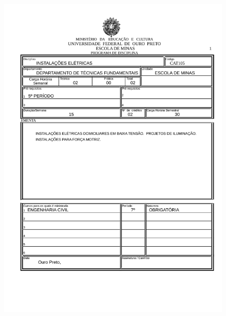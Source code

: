\begin{figure}[p]
	\centering 
	\includegraphics[scale=0.7]{capitulos/anexo1-programas-disciplina/eg33.pdf}
\end{figure}

